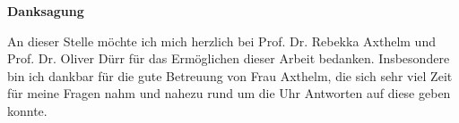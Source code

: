 \thispagestyle{plain}
\cleardoublepage
{}
{}
\vspace*{11pt}
\begin{center}
	{\LARGE \textbf{\textsf{Danksagung}}}
\end{center}

An dieser Stelle möchte ich mich herzlich bei Prof. Dr. Rebekka Axthelm und Prof. Dr. Oliver Dürr für das Ermöglichen dieser Arbeit bedanken. Insbesondere bin ich dankbar für die gute Betreuung von Frau Axthelm, die sich sehr viel Zeit für meine Fragen nahm und nahezu rund um die Uhr Antworten auf diese geben konnte.
